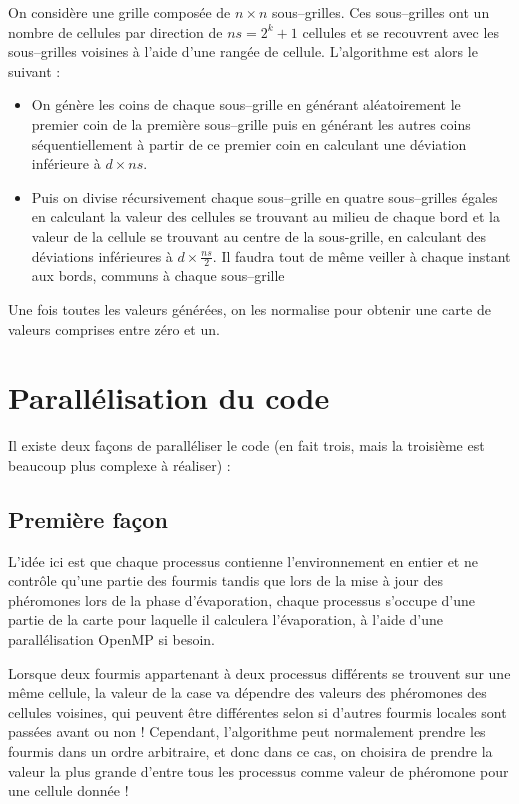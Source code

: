 \documentclass[a4]{article}
\begin{document}
On considère une grille composée de $n\times n$ sous--grilles. Ces sous--grilles ont un nombre de cellules par direction de
$ns=2^{k}+1$ cellules et se recouvrent avec les sous--grilles voisines à l'aide d'une rangée de cellule.
L'algorithme est alors le suivant :
\begin{itemize}
\item On génère les coins de chaque sous--grille en générant aléatoirement le premier coin de la première sous--grille puis en générant les autres coins séquentiellement à partir de ce premier coin en calculant une déviation inférieure à $d\times ns$.
\item Puis on divise récursivement chaque sous--grille en quatre sous--grilles égales en calculant la valeur des cellules se trouvant au milieu
de chaque bord et la valeur de la cellule se trouvant au centre de la sous-grille, en calculant des déviations inférieures à
$d\times \frac{ns}{2}$. Il faudra tout de même veiller à chaque instant aux bords, communs à chaque sous--grille
\end{itemize}

Une fois toutes les valeurs générées, on les normalise pour obtenir une carte de valeurs comprises entre zéro et un.

\section{Parallélisation du code}

Il existe deux façons de paralléliser le code (en fait trois, mais la troisième est beaucoup plus complexe à réaliser) :

\subsection{Première façon}
L'idée ici est que chaque processus contienne l'environnement en entier et ne contrôle qu'une partie des fourmis tandis que lors de la mise
à jour des phéromones lors de la phase d'évaporation, chaque processus s'occupe d'une partie de la carte pour laquelle il calculera l'évaporation, à l'aide d'une parallélisation OpenMP si besoin.

Lorsque deux fourmis appartenant à deux processus différents se trouvent sur une même cellule, la valeur de la case va dépendre des valeurs des phéromones des cellules voisines, qui peuvent être différentes selon si d'autres fourmis locales sont passées avant ou non ! Cependant, l'algorithme peut normalement prendre les fourmis dans un ordre arbitraire, et donc dans ce cas, on choisira de prendre la valeur la plus grande d'entre tous les processus comme valeur de phéromone pour une cellule donnée !
\end{document}
